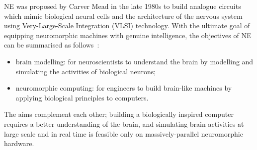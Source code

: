 \documentclass[10pt,journal,compsoc]{IEEEtran}
\begin{document}
NE was proposed by Carver Mead in the late 1980s \cite{Mead:1989:AVN:64998} to build analogue circuits which mimic biological neural cells and the architecture of the nervous system using Very-Large-Scale Integration (VLSI) technology.
With the ultimate goal of equipping neuromorphic machines with genuine intelligence, 
the objectives of NE can be summarised as follows~\cite{furber2007neural}:
\begin{itemize}
	\item brain modelling: for neuroscientists to understand the brain by modelling and simulating the activities of biological neurons; 
	\item neuromorphic computing: for engineers to build brain-like machines by applying biological principles to computers.
\end{itemize}
The aims complement each other; building a biologically inspired computer requires a better understanding of the brain, and simulating brain activities at large scale and in real time is feasible only on massively-parallel neuromorphic hardware.



\end{document}
